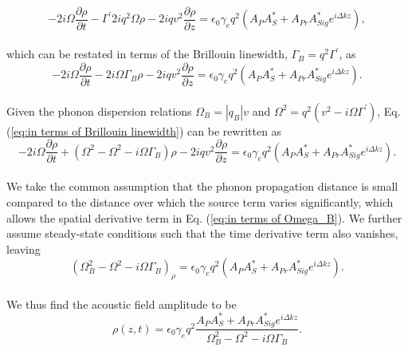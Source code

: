 \documentclass[
sn-nature,
twocolumn
]{sn-jnl}%
\begin{document}
\begin{appendices}
\begin{equation}
    -2i\Omega\frac{\partial\rho}{\partial t} - \Gamma^{\prime}2iq^{2}\Omega\rho - 2iqv^{2}\frac{\partial\rho}{\partial z} = \epsilon_{0}\gamma_{e}q^{2}(A_{P}A_{S}^{*} + A_{Pr}A_{Sig}^{*}e^{i\Delta kz}),
\end{equation}
\\
which can be restated in terms of the Brillouin linewidth, $\Gamma_{B} = q^{2}\Gamma^{\prime}$, as
\\
\begin{equation}
    -2i\Omega\frac{\partial\rho}{\partial t} - 2i\Omega\Gamma_{B}\rho - 2iqv^{2}\frac{\partial\rho}{\partial z} = \epsilon_{0}\gamma_{e}q^{2}(A_{P}A_{S}^{*} + A_{Pr}A_{Sig}^{*}e^{i\Delta kz}).
    \label{eq:in terms of Brillouin linewidth}
\end{equation}
\\
Given the phonon dispersion relations $\Omega_{B} = |q_{B}|v$ and $\Omega^{2} = q^{2}\left(v^{2} - i\Omega\Gamma^{\prime}\right)$, Eq. (\ref{eq:in terms of Brillouin linewidth}) can be rewritten as
\\
\begin{equation}
    -2i\Omega\frac{\partial\rho}{\partial t} + \left(\Omega^{2} - \Omega^{2} - i\Omega\Gamma_{B}\right)\rho - 2iqv^{2}\frac{\partial\rho}{\partial z} = \epsilon_{0}\gamma_{e}q^{2}(A_{P}A_{S}^{*} + A_{Pr}A_{Sig}^{*}e^{i\Delta kz}).
    \label{eq:in terms of Omega_B}
\end{equation}
\\
We take the common assumption that the phonon propagation distance is small compared to the distance over which the source term varies significantly, which allows the spatial derivative term in Eq. (\ref{eq:in terms of Omega_B}). We further assume steady-state conditions such that the time derivative term also vanishes, leaving
\\
\begin{equation}
    (\Omega^{2}_{B} - \Omega^{2} - i\Omega\Gamma_{B})_{\rho} = \epsilon_{0}\gamma_{e}q^{2}(A_{P}A_{S}^{*} + A_{Pr}A_{Sig}^{*}e^{i\Delta kz}).
\end{equation}
\\
We thus find the acoustic field amplitude to be
\\
\begin{equation}
    \rho(z,t) = \epsilon_{0}\gamma_{e}q^{2}\frac{A_{P}A_{S}^{*} + A_{Pr}A_{Sig}^{*}e^{i\Delta kz}}{\Omega_{B}^{2} - \Omega^{2} - i\Omega\Gamma_{B}}.
    \label{eq:Acoustic field amplitude}
\end{equation}



\end{appendices}
\end{document}
